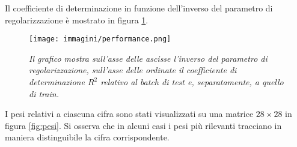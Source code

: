 \documentclass{article}
\begin{document}
Il coefficiente di determinazione in funzione dell'inverso del parametro di regolarizzazione è mostrato in figura \ref{fig:performance}.


\begin{figure}[t]
    \centering
    \texttt{[image: immagini/performance.png]}
    \caption{\emph{Il grafico mostra sull'asse delle ascisse l'inverso del parametro di regolarizzazione, sull'asse delle ordinate il coefficiente di determinazione $R^2$ relativo al batch di test e, separatamente, a quello di train.}}
    \label{fig:performance}
\end{figure}

I pesi relativi a ciascuna cifra sono stati visualizzati su una matrice $28 \times 28$ in figura \ref{fig:pesi}.
Si osserva che in alcuni casi i pesi più rilevanti tracciano in maniera distinguibile la cifra corrispondente.
\end{document}
